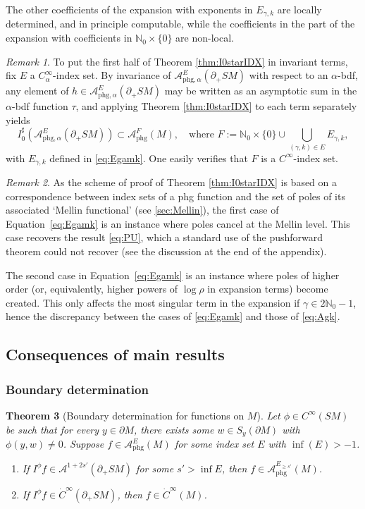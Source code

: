 \documentclass[11pt]{article}
\newcommand{\Subsection}{\subsection}
\newcommand{\Subsubsection}{\subsubsection}
\newenvironment{enumeratei}
{\bgroup\def\theenumi{\roman{enumi}}\def\theenumii{\arabic{enumii}}\begin{enumerate}}
{\end{enumerate}\egroup}
\theoremstyle{plain}
\newtheorem{Theorem}{Theorem}[section]
\theoremstyle{definition}
\theoremstyle{remark}
\newtheorem{Remark}[Theorem]{Remark}
\def\Nm{{\mathbb{N}}}
\def\A{\mathcal{A}}
\newcommand{\phg}{\mathrm{phg}}
\begin{document}
The other coefficients of the expansion with exponents in $E_{\gamma,k}$ are locally determined, and in principle computable, while the coefficients in the part of the expansion with coefficients in $\Nm_0\times\{0\}$ are non-local.

\begin{Remark}
To put the first half of Theorem \ref{thm:I0starIDX} in invariant terms, fix $E$ a $C_{\alpha}^\infty$-index set. By invariance of $\A_{\phg,\alpha}^E (\partial_+ SM)$ with respect to an $\alpha$-bdf, any element of $h\in \A_{\phg,\alpha}^E (\partial_+ SM)$ may be written as an asymptotic sum in the $\alpha$-bdf function $\tau$, and applying Theorem \ref{thm:I0starIDX} to each term separately yields
\begin{equation*}
I_0^\sharp \left(\A_{\phg,\alpha}^E (\partial_+ SM) \right) \subset \A_{\phg}^F (M), \quad \text{where } F:= \Nm_0 \times \{0\} \cup \bigcup_{(\gamma,k)\in E} E_{\gamma,k},
\end{equation*}
with $E_{\gamma,k}$ defined in \eqref{eq:Egamk}. One easily verifies that $F$ is a $C^\infty$-index set.
\end{Remark}

\begin{Remark}
As the scheme of proof of Theorem \ref{thm:I0starIDX} is based on a correspondence between index sets of a phg function and the set of poles of its associated `Mellin functional' (see \ref{sec:Mellin}), the first case of Equation~\eqref{eq:Egamk} is an instance where poles cancel at the Mellin level. This case recovers the result \eqref{eq:PU}, which a standard use of the pushforward theorem could not recover (see the discussion at the end of the appendix).

The second case in Equation~\eqref{eq:Egamk} is an instance where poles of higher order (or, equivalently, higher powers of $\log \rho$ in expansion terms) become created. This only affects the most singular term in the expansion if $\gamma\in 2\Nm_0-1$, hence the discrepancy between the cases of \eqref{eq:Egamk} and those of \eqref{eq:Agk}.
\end{Remark}

\Subsection{Consequences of main results} \label{sec:consequences}

\Subsubsection{Boundary determination}

\begin{Theorem}[Boundary determination for functions on $M$]\label{thm:bdrydet}
Let $\phi\in C^\infty(SM)$ be such that for every $y\in \partial M$, there exists some $w\in S_y(\partial M)$ with $\phi(y,w)\ne 0$.
Suppose $f\in \A^E_{\phg}(M)$ for some index set $E$ with $\inf (E)>-1$.
\begin{enumeratei}
\item\label{thm:bdrydeti}
If $I^\phi f \in \A^{1+2s'} (\partial_+ SM)$ for some $s'>\inf E$, then $f\in \A^{E_{\geq s'}}_{\phg}(M)$.

\item\label{thm:bdrydetii}
If $I^\phi f \in \dot{C}^\infty (\partial_+ SM)$, then $f\in \dot{C}^\infty(M)$.
\end{enumeratei}
\end{Theorem}
\end{document}
